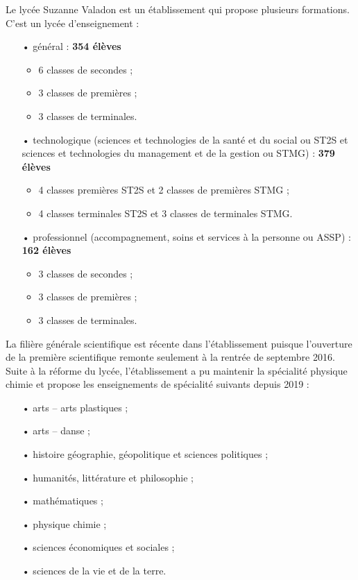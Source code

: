 \documentclass[12pt,a4paper, fleqn]{report}
\begin{document}
Le lycée Suzanne Valadon est un établissement qui propose plusieurs formations.
C'est un lycée d'enseignement :
\begin{itemize}
\item[•] général : \hfill \textbf{354 élèves}
\begin{itemize}
\item 6 classes de secondes ;
\item 3 classes de premières ;
\item 3 classes de terminales.
\end{itemize}
\item[•] technologique (sciences et technologies de la santé et du social ou ST2S et sciences et technologies du management et de la gestion ou STMG) : \hfill \textbf{379 élèves}
\begin{itemize}
\item 4 classes premières ST2S et 2 classes de premières STMG ;
\item 4 classes terminales ST2S et 3 classes de terminales STMG.
\end{itemize}
\item[•] professionnel (accompagnement, soins et services à la personne ou ASSP) : \hfill \textbf{162 élèves}
\begin{itemize}
\item 3 classes de secondes ;
\item 3 classes de premières ;
\item 3 classes de terminales.
\end{itemize}
\end{itemize}

La filière générale scientifique est récente dans l'établissement puisque l'ouverture de la première scientifique remonte seulement à la rentrée de septembre 2016.
Suite à la réforme du lycée, l'établissement a pu maintenir la spécialité physique chimie et propose les enseignements de spécialité suivants depuis 2019 : 
\begin{itemize}
\item[•] arts -- arts plastiques ;
\item[•] arts -- danse ;
\item[•] histoire géographie, géopolitique et sciences politiques ;
\item[•] humanités, littérature et philosophie ;
\item[•] mathématiques ;
\item[•] physique chimie ;
\item[•] sciences économiques et sociales ;
\item[•] sciences de la vie et de la terre.
\end{itemize}
\end{document}

